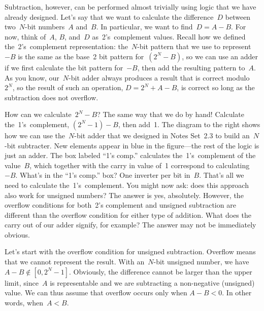 Subtraction, however, can be performed almost trivially using logic that
we have already designed.
%
Let's say that we want to calculate the difference~$D$ between 
two~\mbox{$N$-bit} numbers~$A$ and~$B$.  In particular, we want 
to find~$D=A-B$.  For now, think of~$A$, $B$, and~$D$ 
as~2's~complement values.
%
Recall how we defined the~2's~complement representation: 
the~\mbox{$N$-bit} pattern that we use to represent~$-B$ is the 
same as the base~2 bit pattern for~$(2^N-B)$, so we can use an adder if we
first calculate the bit pattern for~$-B$, then add the resulting
pattern to~$A$.
As you know, our~\mbox{$N$-bit} adder always produces a result that
is correct modulo~$2^N$, so the result of such an operation,
$D=2^N+A-B$, is correct so long as the subtraction does not overflow.

\begin{minipage}{4.7in}
How can we calculate~$2^N-B$?  The same way that we do by hand!
Calculate the~1's~complement, $(2^N-1)-B$, then add~1.
%
The diagram to the right shows how we can use the~\mbox{$N$-bit} adder
that we designed in Notes Set~2.3 to build an~\mbox{$N$-bit} subtracter.
%
New elements appear in blue in the figure---the rest of the logic
is just an adder.  The box labeled ``1's comp.'' calculates 
the~\mbox{1's complement} of the value~$B$, which together with the
carry in value of~1 correspond to calculating~$-B$.  What's in the
``1's comp.'' box?  One inverter per bit in~$B$.  That's all 
we need to calculate the~1's~complement.
%
You might now ask: does this approach also work for unsigned numbers?
The answer is yes, absolutely.  However, the overflow conditions for
both~2's complement and unsigned subtraction are different than the
overflow condition for either type of addition.  What does the carry
out of our adder signify, for example?  The answer may not be 
immediately obvious.
\end{minipage}\hspace{.25in}%
\begin{minipage}{1.55in}
\end{minipage}

Let's start with the overflow condition for unsigned subtraction.
%
Overflow means that we cannot represent the result.  With an~\mbox{$N$-bit}
unsigned number, we have~$A-B\not\in[0,2^N-1]$.  Obviously, the difference
cannot be larger than the upper limit, since~$A$ is representable and
we are subtracting a non-negative (unsigned) value.  We can thus assume
that overflow occurs only when $A-B<0$.  In other words, when~$A<B$.


